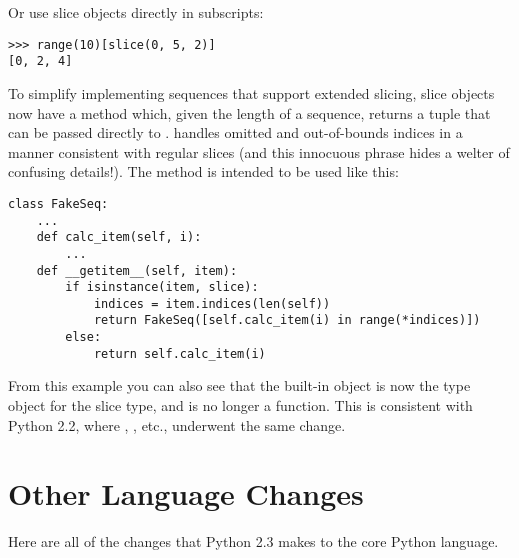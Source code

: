 \documentclass{howto}
\begin{document}
Or use slice objects directly in subscripts:

\begin{verbatim}
>>> range(10)[slice(0, 5, 2)]
[0, 2, 4]
\end{verbatim}

To simplify implementing sequences that support extended slicing,
slice objects now have a method  which,
given the length of a sequence, returns a  tuple that can be passed directly to
.
 handles omitted and out-of-bounds indices in a
manner consistent with regular slices (and this innocuous phrase hides
a welter of confusing details!).  The method is intended to be used
like this:

\begin{verbatim}
class FakeSeq:
    ...
    def calc_item(self, i):
        ...
    def __getitem__(self, item):
        if isinstance(item, slice):
            indices = item.indices(len(self))
            return FakeSeq([self.calc_item(i) in range(*indices)])
        else:
            return self.calc_item(i)
\end{verbatim}

From this example you can also see that the built-in 
object is now the type object for the slice type, and is no longer a
function.  This is consistent with Python 2.2, where ,
, etc., underwent the same change.


\section{Other Language Changes}

Here are all of the changes that Python 2.3 makes to the core Python
language.
\end{document}
